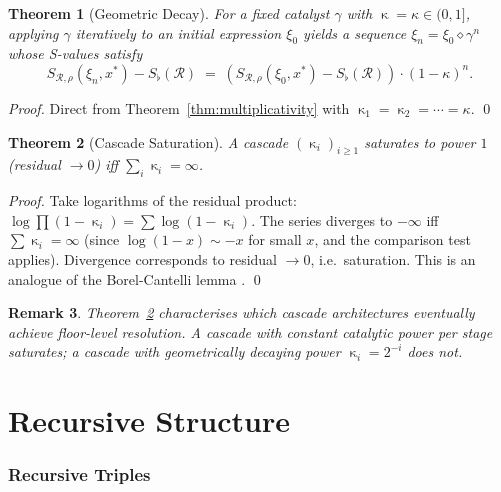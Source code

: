\documentclass[twocolumn,a4paper]{article}
\newtheorem{theorem}{Theorem}[section]
\newtheorem{remark}[theorem]{Remark}
\DeclareMathOperator{\catpow}{\kappa}
\newcommand{\receiver}{\mathcal{R}}
\newcommand{\Sscalar}{S}
\newcommand{\Sfloor}{S_{\flat}}
\begin{document}
\begin{theorem}[Geometric Decay]
\label{thm:geometric-decay}
For a fixed catalyst $\gamma$ with $\catpow=\kappa\in(0,1]$, applying $\gamma$ iteratively to an initial expression $\xi_{0}$ yields a sequence $\xi_{n}=\xi_{0}\diamond\gamma^{n}$ whose S-values satisfy
\[
\Sscalar_{\receiver,\rho}(\xi_{n},x^{*})-\Sfloor(\receiver)\;=\;(\Sscalar_{\receiver,\rho}(\xi_{0},x^{*})-\Sfloor(\receiver))\cdot(1-\kappa)^{n}.
\]
\end{theorem}

\begin{proof}
Direct from Theorem~\ref{thm:multiplicativity} with $\catpow_{1}=\catpow_{2}=\cdots=\kappa$. \qed
\end{proof}

\begin{theorem}[Cascade Saturation]
\label{thm:cascade-saturation}
A cascade $(\catpow_{i})_{i\geq 1}$ saturates to power $1$ (residual $\to 0$) iff $\sum_{i}\catpow_{i}=\infty$.
\end{theorem}

\begin{proof}
Take logarithms of the residual product: $\log\prod(1-\catpow_{i})=\sum\log(1-\catpow_{i})$. The series diverges to $-\infty$ iff $\sum\catpow_{i}=\infty$ (since $\log(1-x)\sim-x$ for small $x$, and the comparison test applies). Divergence corresponds to residual $\to 0$, i.e.\ saturation. This is an analogue of the Borel-Cantelli lemma \citep{borel1909probabilites,cantelli1917somma}. \qed
\end{proof}

\begin{remark}
Theorem~\ref{thm:cascade-saturation} characterises which cascade architectures eventually achieve floor-level resolution. A cascade with constant catalytic power per stage saturates; a cascade with geometrically decaying power $\catpow_{i}=2^{-i}$ does not.
\end{remark}

\part{Recursive Structure}

\section{Recursive Triples}
\label{sec:recursive-triples}
\end{document}
